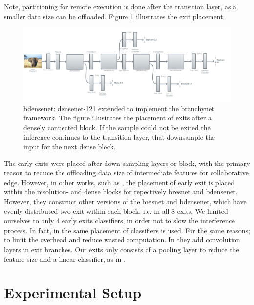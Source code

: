 Note, partitioning for remote execution is done after the transition layer, as a smaller data size can be offloaded. Figure \ref{fig:b-densenet} illustrates the exit placement.

\begin{figure}
	\centering
	\includegraphics[width=\linewidth]{figures/models/b-densenet}
	\caption[B-\gls{densenet} architecture]{\gls{bdensenet}: \gls{densenet}-121 extended to implement the \gls{branchynet} framework. The figure illustrates the placement of exits after a densely connected block. If the sample could not be exited the inference continues to the transition layer, that downsample the input for the next dense block. }
	\label{fig:b-densenet}
\end{figure}

The early exits were placed after down-sampling layers or block, with the primary reason to reduce the offloading data size of intermediate features for collaborative edge. However, in other works, such as \cite{huang_multi-scale_2017}, the placement of early exit is placed within the resolution- and dense blocks for repectively \gls{bresnet} and \gls{bdensenet}. However, they construct other versions of the \gls{bresnet} and \gls{bdensenet}, which have evenly distributed two exit within each block, i.e. in all 8 exits. We limited ourselves to only 4 early exits classifiers, in order not to slow the interference process. In fact, in \cite{berestizshevsky_sacrificing_2019} the same placement of classifiers is used. For the same reasons; to limit the overhead and reduce wasted computation. In \cite{teerapittayanon_branchynet:_2016} they add convolution layers in exit branches. Our exits only consists of a pooling layer to reduce the feature size and a linear classifier, as in \cite{kaya_shallow-deep_nodate}.


\section{Experimental Setup} \label{sec:ee-exp-setup}

